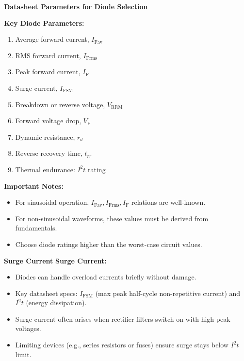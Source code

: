     \begin{frame}{\textbf{Datasheet Parameters for Diode Selection}}
    
    \textbf{Key Diode Parameters:}
    \begin{enumerate}
        \item Average forward current, $I_{\text{Fav}}$
        \item RMS forward current, $I_{\text{Frms}}$
        \item Peak forward current, $I_{\text{F}}$
        \item Surge current, $I_{\text{FSM}}$
        \item Breakdown or reverse voltage, $V_{\text{RRM}}$
        \item Forward voltage drop, $V_{\text{F}}$
        \item Dynamic resistance, $r_d$
        \item Reverse recovery time, $t_{rr}$
        \item Thermal endurance: $I^2t$ rating
    \end{enumerate}
    
    \textbf{Important Notes:}
    \begin{itemize}
        \item For sinusoidal operation, $I_{\text{Fav}}, I_{\text{Frms}}, I_{\text{F}}$ relations are well-known.
        \item For non-sinusoidal waveforms, these values must be derived from fundamentals.
        \item Choose diode ratings higher than the worst-case circuit values.
    \end{itemize}
    
    \end{frame}
    
    \begin{frame}{\textbf{Surge Current}}
        \textbf{Surge Current:}
        \begin{itemize}
            \item Diodes can handle overload currents briefly without damage.
            \item Key datasheet specs: $I_{\text{FSM}}$ (max peak half-cycle non-repetitive current) and $I^2t$ (energy dissipation).
            \item Surge current often arises when rectifier filters switch on with high peak voltages.
            \item Limiting devices (e.g., series resistors or fuses) ensure surge stays below $I^2t$ limit.
        \end{itemize}
    \end{frame}
        
